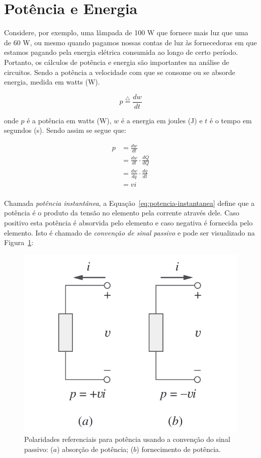 \section{Potência e Energia}

Considere, por exemplo, uma lâmpada de 100 W que fornece mais luz que uma de 60
W, ou mesmo quando pagamos nossas contas de luz às fornecedoras em que estamos
pagando pela energia elétrica consumida ao longo de certo período. Portanto, os
cálculos de potência e energia são importantes na análise de circuitos. Sendo a
potência a velocidade com que se consome ou se absorde energia, medida em
watts (W).

\begin{equation}
	\label{eq:potencia}
	p \overset{\triangle}{=} \frac{dw}{dt}
\end{equation}

onde \( p \) é a potência em watts (W), \( w \) é a energia em joules (J) e \( t
\) é o tempo em segundos (s). Sendo assim se segue que:

\begin{equation}
	\begin{aligned}
		\label{eq:potencia-instantanea}
		p & = \frac{dw}{dt}                     \\
		  & = \frac{dw}{dt} \cdot \frac{dQ}{dQ} \\
		  & = \frac{dw}{dq} \cdot \frac{dq}{dt} \\
		  & = vi                                \\
	\end{aligned}
\end{equation}

Chamada \textit{potência instantânea}, a Equação~\ref{eq:potencia-instantanea}
define que a potência é o produto da tensão no elemento pela corrente através
dele. Caso positivo esta potência é absorvida pelo elemento e caso negativa é
fornecida pelo elemento. Isto é chamado de \textit{convenção de sinal passivo} e
pode ser visualizado na Figura~\ref{fig:fig3}:

\begin{figure}[H]
	\centering
	\setlength{\fboxsep}{0pt}
	\includegraphics[height=0.15\textwidth]{./fig/fig3.png}
	\caption{Polaridades referenciais para potência usando a convenção do sinal
		passivo: (\( a \)) absorção de potência; (\( b \)) fornecimento de potência.}
	\label{fig:fig3}
\end{figure}

